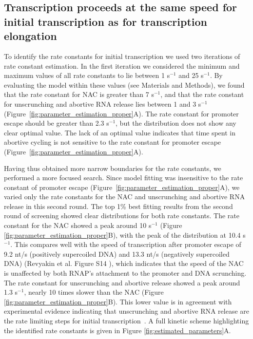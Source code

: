 %
\subsection{Transcription proceeds at the same speed for initial transcription
as for transcription elongation}

To identify the rate constants for initial transcription we used two
iterations of rate constant estimation. In the first iteration we considered the
minimum and maximum values of all rate constants to lie between 1 s$^{-1}$ and
25 s$^{-1}$. By evaluating the model within these values (see Materials and
Methods), we found that the rate constant for NAC is greater than 7 s$^{-1}$,
and that the rate constant for unscrunching and abortive RNA release lies
between 1 and 3 s$^{-1}$ (Figure~\ref{fig:parameter_estimation_proper}A).  The
rate constant for promoter escape should be greater than 2.3 s$^{-1}$, but the
distribution does not show any clear optimal value. The lack of an optimal
value indicates that time spent in abortive cycling is not sensitive to the
rate constant for promoter escape
(Figure~\ref{fig:parameter_estimation_proper}A).

Having thus obtained more narrow boundaries for the rate constants, we
performed a more focused search. Since model fitting was insensitive to the
rate constant of promoter escape
(Figure~\ref{fig:parameter_estimation_proper}A), we varied only the rate
constants for the NAC and unscrunching and abortive RNA release in this second
round. The top 1\% best fitting results from the second round of screening
showed clear distributions for both rate constants.  The rate constant for the
NAC showed a peak around 10 s$^{-1}$ (Figure
\ref{fig:parameter_estimation_proper}B), with the peak of the distribution at
10.4 s$^{-1}$. This compares well with the speed of transcription after
promoter escape of 9.2 nt/s (positively supercoiled DNA) and 13.3 nt/s
(negatively supercoiled DNA) (Revyakin et al. Figure S14
\cite{revyakin_abortive_2006}), which indicates that the speed of the NAC is
unaffected by both RNAP's attachment to the promoter and DNA scrunching. The
rate constant for unscrunching and abortive release showed a peak around 1.3
s$^{-1}$, nearly 10 times slower than the NAC (Figure
\ref{fig:parameter_estimation_proper}B). This lower value is in agreement with
experimental evidence indicating that unscrunching and abortive RNA release
are the rate limiting steps for initial
transcription~\cite{revyakin_abortive_2006, margeat_direct_2006}. A full
kinetic scheme highlighting the identified rate constants is given in Figure
\ref{fig:estimated_parameters}A.

